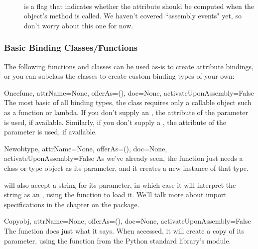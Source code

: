 \begin{verbatim%
}
\begin{verbatim%
}
\begin{verbatim%
}
\begin{verbatim%
}
\begin{verbatim%
}
\begin{verbatim%
}
\begin{verbatim%
}
\begin{verbatim%
}
\begin{verbatim%
}
\begin{description}
\item[] \hfill \\
 is a flag that indicates whether the attribute should
be computed when the object's  method is called.  We
haven't covered ``assembly events" yet, so don't worry about this one for now.

\end{description}

\subsubsection{Basic Binding Classes/Functions}

The following functions and classes can be used as-is to create attribute
bindings, or you can subclass the classes to create custom binding types
of your own:

\begin{funcdesc}{Once}{func, attrName=None, offerAs=(), doc=None, activateUponAssembly=False}
The most basic of all binding types, the  class requires
only a callable object such as a function or lambda.  If you don't supply an
, the  attribute of the  parameter is
used, if available.  Similarly, if you don't supply a , the
 attribute of the  parameter is used, if available.
\end{funcdesc}

\begin{funcdesc}{New}{obtype, attrName=None, offerAs=(), doc=None,
activateUponAssembly=False}
As we've already seen, the  function just needs a class or
type object as its  parameter, and it creates a new instance of that
type.

 will also accept a string for its  parameter,
in which case it will interpret the string as an ,
using the  function to load it.  We'll
talk more about import specifications in the chapter on the
 package.
\end{funcdesc}

\begin{funcdesc}{Copy}{obj, attrName=None, offerAs=(), doc=None, activateUponAssembly=False}
The  function does just what it says.  When accessed, it
will create a copy of its  parameter, using the 
function from the Python standard library's  module.
\end{funcdesc}










\end{verbatim%
}
\end{verbatim%
}
\end{verbatim%
}
\end{verbatim%
}
\end{verbatim%
}
\end{verbatim%
}
\end{verbatim%
}
\end{verbatim%
}
\end{verbatim%
}
